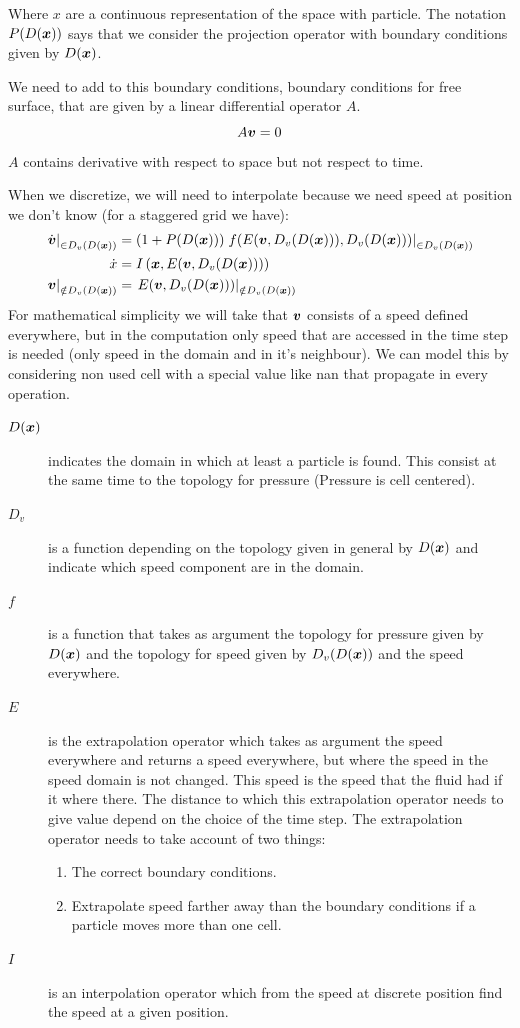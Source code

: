 Where $x$ are a continuous representation of the space with particle.
The notation $P(D({\boldsymbol {x}}))$ says that we consider the projection operator with boundary conditions given by $D({\boldsymbol {x}})$.

We need to add to this boundary conditions, boundary conditions for free surface, that are given by a linear differential operator $A$.
\begin{equation}
	A{\boldsymbol {v}}=0
\end{equation}
$A$ contains derivative with respect to space but not respect to time.

When we discretize, we will need to interpolate because we need speed at position we don't know (for a staggered grid we have):
\begin{align*}
	\left.\dot{{\boldsymbol {v}}}\right|_{\in D_{v}(D({\boldsymbol {x}}))}&=\left(1+P(D({\boldsymbol {x}}))\right)\left.f(E({\boldsymbol {v}},D_v(D({\boldsymbol {x}}))),D_{v}(D({\boldsymbol {x}})))\right|_{\in D_{v}(D({\boldsymbol {x}}))}\\
	\dot{x}&=I\left({\boldsymbol {x}},E({\boldsymbol {v}},D_v(D({\boldsymbol {x}})))\right)\\
	\left.{\boldsymbol {v}}\right|_{\notin D_{v}(D({\boldsymbol {x}}))}&=\left.E({\boldsymbol {v}},D_v(D({\boldsymbol {x}})))\right|_{\notin D_{v}(D({\boldsymbol {x}}))}
\end{align*}
For mathematical simplicity we will take that ${\boldsymbol {v}}$ consists of a speed defined everywhere, 
but in the computation only speed that are accessed in the time step is needed (only speed in the domain and in it's neighbour).
We can model this by considering non used cell with a special value like nan that propagate in every operation.
\begin{description}
\item[$D({\boldsymbol {x}})$] indicates the domain in which at least a particle is found. This consist at the same time to the topology for pressure (Pressure is cell centered).
\item[$D_{v}$] is a function depending on the topology given in general by $D({\boldsymbol {x}})$ and indicate which speed component are in the domain.
\item[$f$] is a function that takes as argument the topology for pressure given by $D({\boldsymbol {x}})$ and the topology for speed given by $D_v(D({\boldsymbol {x}}))$ and the speed everywhere.
\item[$E$] is the extrapolation operator which takes as argument the speed everywhere and returns a speed everywhere,
but where the speed in the speed domain is not changed. This speed is the speed that the fluid had if it where there.
The distance to which this extrapolation operator needs to give value depend on the choice of the time step.
The extrapolation operator needs to take account of two things:
\begin{enumerate}
	\item The correct boundary conditions.
	\item Extrapolate speed farther away than the boundary conditions if a particle moves more than one cell.
\end{enumerate}
\item[$I$] is an interpolation operator which from the speed at discrete position find the speed at a given position.
\end{description}
